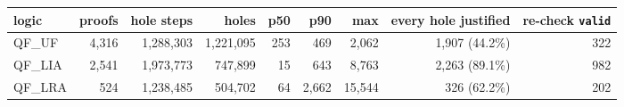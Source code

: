\begin{tabular}{lrrrrrrrr}
\toprule
logic & proofs & hole steps & holes & p50 & p90 & max & every hole justified & re-check \texttt{valid} \\
\midrule
QF\_UF & 4,316 & 1,288,303 & 1,221,095 & 253 & 469 & 2,062 & 1,907 (44.2\%) & 322 \\
QF\_LIA & 2,541 & 1,973,773 & 747,899 & 15 & 643 & 8,763 & 2,263 (89.1\%) & 982 \\
QF\_LRA & 524 & 1,238,485 & 504,702 & 64 & 2,662 & 15,544 & 326 (62.2\%) & 202 \\
\bottomrule
\end{tabular}
